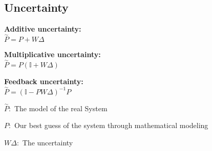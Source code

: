 \subsection{Uncertainty}
    \begin{minipage}{0.5\linewidth}
            \textbf{Additive uncertainty:}\\ $\overset{\sim}{P} = P + W\Delta$
            \vspace{3pt}

            \textbf{Multiplicative uncertainty:}\\ $\overset{\sim}{P} = P(\mathbb{I} + W\Delta)$
            \vspace{3pt}

            \textbf{Feedback uncertainty:}\\ $\overset{\sim}{P} = (\mathbb{I}-PW\Delta)^{-1}P$
    \end{minipage}
    \begin{minipage}{0.49\linewidth}
            $\overset{\sim}{P}:$ The model of the real System
            \vspace{1em}

            $P:$ Our best guess of the system through mathematical modeling
            \vspace{0pt}

            $W\Delta:$ The uncertainty
    \end{minipage}